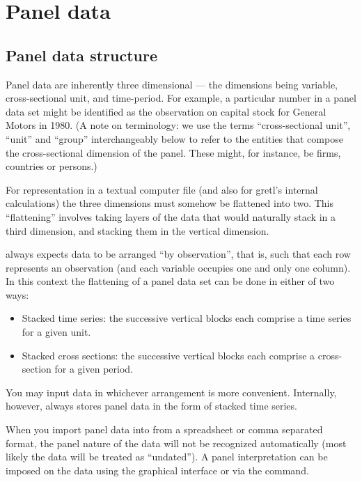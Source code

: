 \chapter{Panel data}
\label{chap-panel}

\section{Panel data structure}
\label{panel-structure}

Panel data are inherently three dimensional --- the dimensions being
variable, cross-sectional unit, and time-period.  For example, a
particular number in a panel data set might be identified as the
observation on capital stock for General Motors in 1980.  (A note on
terminology: we use the terms ``cross-sectional unit'', ``unit'' and
``group'' interchangeably below to refer to the entities that compose
the cross-sectional dimension of the panel.  These might, for
instance, be firms, countries or persons.)

For representation in a textual computer file (and also for gretl's
internal calculations) the three dimensions must somehow be flattened
into two.  This ``flattening'' involves taking layers of the data that
would naturally stack in a third dimension, and stacking them in the
vertical dimension.

 always expects data to be arranged ``by observation'',
that is, such that each row represents an observation (and each
variable occupies one and only one column).  In this context the
flattening of a panel data set can be done in either of two ways:

\begin{itemize}
\item Stacked time series: the successive vertical blocks each
  comprise a time series for a given unit.
\item Stacked cross sections: the successive vertical blocks each
  comprise a cross-section for a given period.
\end{itemize}

You may input data in whichever arrangement is more convenient.
Internally, however,  always stores panel data in
the form of stacked time series.

When you import panel data into  from a spreadsheet or
comma separated format, the panel nature of the data will not be
recognized automatically (most likely the data will be treated as
``undated'').  A panel interpretation can be imposed on the data
using the graphical interface or via the  command.

